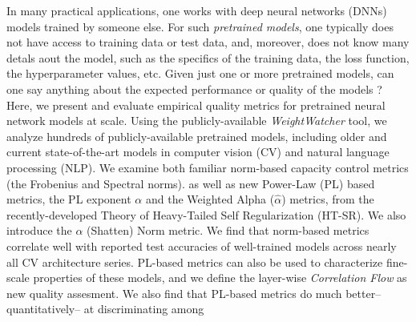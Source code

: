 
In many practical applications, one works with deep neural networks (DNNs) models trained by someone else.
For such \emph{pretrained models}, one typically does not have access to training data or test data, 
and, moreover,  does not know many detals aout the  model, such as
the specifics of the training data, the loss function, the hyperparameter values, etc.
Given just one or more pretrained models, can one say anything about the expected performance or quality of the models ?
Here, we present and evaluate empirical quality metrics for pretrained neural network models at scale.
%
Using the publicly-available \emph{WeightWatcher} tool, we analyze hundreds of publicly-available pretrained models, including older and current state-of-the-art models in computer vision (CV) and natural language processing (NLP).
We examine both familiar norm-based capacity control metrics (the Frobenius and  Spectral norms). as well as
new Power-Law (PL) based metrics, the PL exponent $\alpha$ and the Weighted Alpha ($\hat{\alpha}$) metrics,
from the recently-developed Theory of Heavy-Tailed Self Regularization (HT-SR).
We also introduce the $\alpha$ (Shatten) Norm metric.
We find that norm-based metrics correlate well with reported test accuracies of well-trained models
across nearly all CV architecture series.
PL-based metrics can also be used to characterize fine-scale properties of these models, and
we define the layer-wise \emph{Correlation Flow} as new quality assesment.
We also find that PL-based metrics do much better--quantitatively-- at discriminating among
